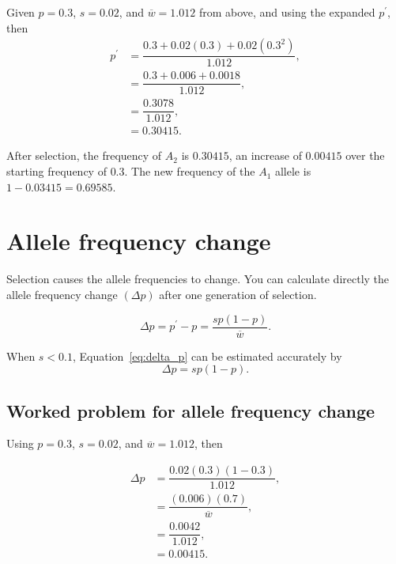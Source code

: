 \documentclass[letterpaper,nofonts]{tufte-handout}
\begin{document}
\newpage

Given $p = 0.3$, $s = 0.02$, and $\overline{w} = 1.012$ from above, and using the expanded $p^\prime$, then
{\setlength{\jot}{0.8em}
\begin{align*}
p^\prime &= \dfrac{0.3 + 0.02\left(0.3\right) + 0.02\left(0.3^2\right)}{1.012}, \\
         &= \dfrac{0.3 + 0.006 + 0.0018}{1.012}, \\
         &= \dfrac{0.3078}{1.012},\\
         &= 0.30415.
\end{align*}
}

After selection, the frequency of $A_2$ is $0.30415$, an increase of $0.00415$ over the starting frequency of $0.3$. The new frequency of the $A_1$ allele is $1-0.03415 = 0.69585$.

\section*{Allele frequency change}

Selection causes the allele frequencies to change. You can calculate directly the allele frequency change  $\left(\Delta p\right)$ after one generation of selection. 

%
\begin{equation}\label{eq:delta_p}
\Delta p = p^\prime - p = \dfrac{sp(1-p)}{\overline{w}}.
\end{equation}

When $s < 0.1$, Equation~\ref{eq:delta_p} can be estimated accurately by
%
%
\begin{equation}\label{eq:delta_p_approx}
\Delta p = sp(1-p).
\end{equation}
%


\subsection{Worked problem for allele frequency change}

Using $p = 0.3$, $s = 0.02$, and $\overline{w} = 1.012$, then

{\setlength{\jot}{0.8em}\begin{align*}
\Delta p &= \dfrac{0.02(0.3)(1-0.3)}{1.012},\\
         &= \dfrac{(0.006)(0.7)}{\overline{w}},\\
         &= \dfrac{0.0042}{1.012}, \\
         &= 0.00415.
\end{align*}
}
\end{document}
